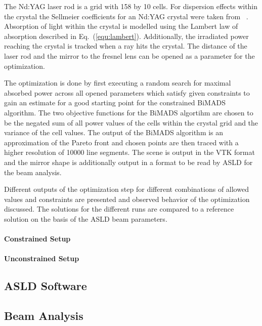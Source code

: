 \documentclass[a4paper,10pt]{article}
\newcommand{\equref}[1]{Eq.~(\ref{#1})}
\begin{document}
    The Nd:YAG laser rod is a grid with 158 by 10 cells.
    For dispersion effects within the crystal the Sellmeier coefficients
    for an Nd:YAG crystal were taken from ~\cite{sellmeier_ndyag}.
    Absorption of light within the crystal is modelled using the Lambert
    law of absorption described in \equref{equ:lambert}.
    Additionally, the irradiated power reaching the crystal is
    tracked when a ray hits the crystal.
    The distance of the laser rod and the mirror to the
    fresnel lens can be opened as a parameter for the optimization.

    The optimization is done by first executing a random search
    for maximal absorbed power across all opened parameters 
    which satisfy given constraints to gain
    an estimate for a good starting point for the 
    constrained BiMADS algorithm.
    The two objective functions for the BiMADS algortihm are chosen
    to be the negated sum of all power values of the cells within the
    crystal grid and the variance of the cell values.
    The output of the BiMADS algorithm is an approximation 
    of the Pareto front and chosen points are then traced with
    a higher resolution of 10000 line segments.
    The scene is output in the VTK format
    and the mirror shape is additionally output in a format to 
    be read by ASLD for the beam analysis.

    Different outputs of the optimization step for different 
    combinations of allowed values and constraints are presented and
    observed behavior of the optimization discussed.
    The solutions for the different runs are compared to a 
    reference solution on the basis of the ASLD beam parameters.

    \paragraph{Constrained Setup}
    \paragraph{Unconstrained Setup}

    \subsection{ASLD Software}
    \subsection{Beam Analysis}
    
    \newpage

    
    
\end{document}
